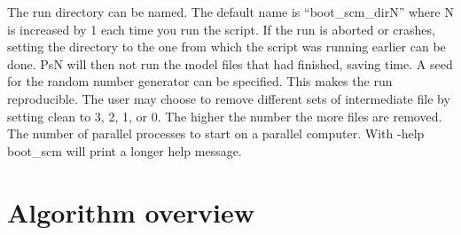 \begin{optionlist}
The run directory can be named. The default name is “boot\_scm\_dirN” where N is increased by 1 each time you run the script. If the run is aborted or crashes, setting the directory to the one from which the script was running earlier can be done. PsN will then not run the model files that had finished, saving time. 
\nextopt
{}
A seed for the random number generator can be specified. This makes the run reproducible.  
\nextopt
{}
The user may choose to remove different sets of intermediate file by setting clean to 3, 2, 1, or 0. The higher the number the more files are removed. 
\nextopt
{}
The number of parallel processes to start on a parallel computer. 
\nextopt
{}
With -help boot\_scm will print a longer help message. 
\nextopt
\end{optionlist}


\section{Algorithm overview}

